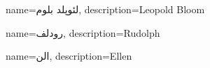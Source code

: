 {
name={لئوپلد بلوم},
description={Leopold Bloom}
}

{
name={رودلف},
description={Rudolph}
}

{
name={الن},
description={Ellen}
}